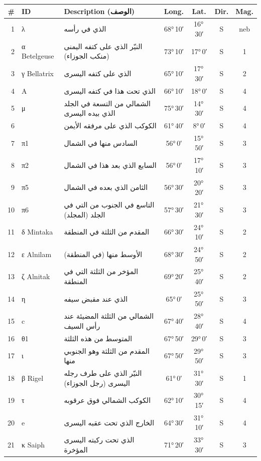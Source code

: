 \documentclass[9pt,a4paper]{extarticle}
\newcommand{\ar}[1]{{\arabicfont\textarabic{#1}}}
\begin{document}
\begin{longtable}{r l >{\raggedright\arraybackslash}p{6.7cm} c c c c}
\toprule \# & ID & Description (\ar{الوصف}) & Long. & Lat. & Dir. & Mag.\\ \midrule\endhead
1 & λ & \ar{الذي في رأسه} & 68°\,10′ & 16°\,30′ & S & neb\\
2 & α Betelgeuse & \ar{النيّر الذي على كتفه اليمنى (منكب الجوزاء)} & 73°\,10′ & 17°\,0′ & S & 1\\
3 & γ Bellatrix & \ar{الذي على كتفه اليسرى} & 65°\,10′ & 17°\,30′ & S & 2\\
4 & A & \ar{الذي تحت هذا في كتفه اليسرى} & 66°\,10′ & 18°\,0′ & S & 4\\
5 & μ & \ar{الشمالي من التسعة في الجلد الذي بيده اليسرى} & 75°\,30′ & 14°\,30′ & S & 4\\
6 &  & \ar{الكوكب الذي على مرفقه الأيمن} & 61°\,40′ & 8°\,0′ & S & 4\\
7 & π1 & \ar{السادس منها في الشمال} & 56°\,0′ & 15°\,50′ & S & 3\\
8 & π2 & \ar{السابع الذي بعد هذا في الشمال} & 56°\,0′ & 17°\,10′ & S & 3\\
9 & π5 & \ar{الثامن الذي بعده في الشمال} & 56°\,30′ & 20°\,20′ & S & 3\\
10 & π6 & \ar{التاسع في الجنوب من التي في الجلد (المجلد)} & 57°\,30′ & 21°\,30′ & S & 3\\
11 & δ Mintaka & \ar{المقدم من الثلثة في المنطقة} & 66°\,30′ & 24°\,10′ & S & 2\\
12 & ε Alnilam & \ar{الأوسط منها (في المنطقة)} & 68°\,30′ & 24°\,50′ & S & 2\\
13 & ζ Alnitak & \ar{المؤخر من الثلثة التي في المنطقة} & 69°\,20′ & 25°\,40′ & S & 2\\
14 & η & \ar{الذي عند مقبض سيفه} & 65°\,0′ & 25°\,50′ & S & 3\\
15 & c & \ar{الشمالي من الثلثة المضيئة عند رأس السيف} & 67°\,40′ & 28°\,40′ & S & 4\\
16 & θ1 & \ar{المتوسط من هذه الثلثة} & 67°\,50′ & 29°\,0′ & S & 3\\
17 & ι & \ar{المقدم من الثلثة وهو الجنوبي منها} & 67°\,50′ & 29°\,50′ & S & 3\\
18 & β Rigel & \ar{النيّر الذي على طرف رجله اليسرى (رجل الجوزاء)} & 61°\,0′ & 31°\,30′ & S & 1\\
19 & τ & \ar{الكوكب الشمالي فوق عرقوبه} & 62°\,10′ & 30°\,15′ & S & 4\\
20 & e & \ar{الخارج الذي تحت عقبه اليسرى} & 64°\,30′ & 31°\,10′ & S & 4\\
21 & κ Saiph & \ar{الذي تحت ركبته اليسرى المؤخرة} & 71°\,20′ & 33°\,30′ & S & 3\\
\bottomrule\end{longtable}
\end{document}
